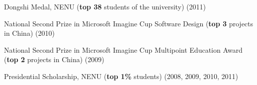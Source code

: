 \documentclass[10pt]{article}
\renewcommand{\section}[1]{\pagebreak[3]%
    \vspace{1.3\baselineskip}%
    \phantomsection\addcontentsline{toc}{section}{#1}%
    \noindent\llap{\scshape\smash{\parbox[t]{\marginparwidth}{\hyphenpenalty=10000\raggedright #1}}}%
    \vspace{-\baselineskip}\par}
\begin{document}
\begin{innerlist}
\item Dongshi Medal, NENU (\textbf{top 38} students of the university) (2011)
\item National Second Prize in Microsoft Imagine Cup Software Design (\textbf{top 3} projects in China) (2010)
\item National Second Prize in Microsoft Imagine Cup Multipoint Education Award (\textbf{top 2} projects in China) (2009)
\item Presidential Scholarship, NENU (\textbf{top 1\%} students) (2008, 2009, 2010, 2011)
\end{innerlist}


\end{document}
